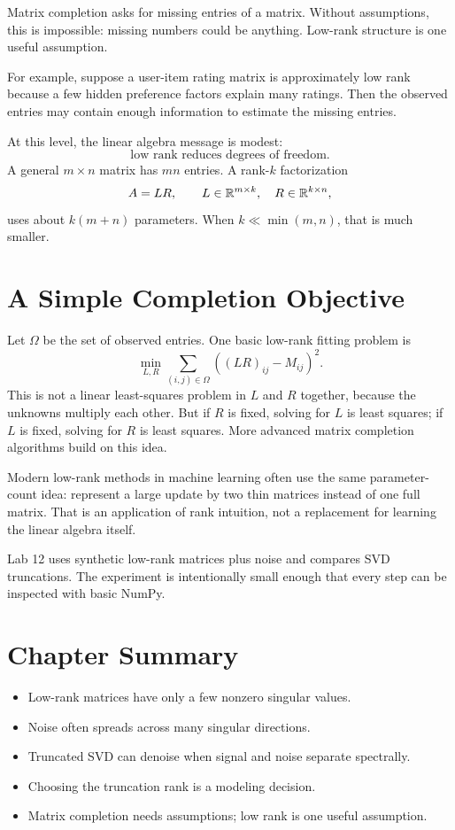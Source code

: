 Matrix completion asks for missing entries of a matrix. Without assumptions,
this is impossible: missing numbers could be anything. Low-rank structure is
one useful assumption.

For example, suppose a user-item rating matrix is approximately low rank
because a few hidden preference factors explain many ratings. Then the observed
entries may contain enough information to estimate the missing entries.

At this level, the linear algebra message is modest:
\[
  \text{low rank reduces degrees of freedom.}
\]
A general $m\times n$ matrix has $mn$ entries. A rank-$k$ factorization
\[
  A=LR,
  \qquad
  L\in\mathbb{R}^{m\times k},
  \quad
  R\in\mathbb{R}^{k\times n},
\]
uses about $k(m+n)$ parameters. When $k\ll \min(m,n)$, that is much smaller.

\section{A Simple Completion Objective}

Let $\Omega$ be the set of observed entries. One basic low-rank fitting problem
is
\[
  \min_{L,R}
  \sum_{(i,j)\in\Omega}
  \left((LR)_{ij}-M_{ij}\right)^2.
\]
This is not a linear least-squares problem in $L$ and $R$ together, because the
unknowns multiply each other. But if $R$ is fixed, solving for $L$ is least
squares; if $L$ is fixed, solving for $R$ is least squares. More advanced
matrix completion algorithms build on this idea.

\begin{aimlbox}
Modern low-rank methods in machine learning often use the same parameter-count
idea: represent a large update by two thin matrices instead of one full matrix.
That is an application of rank intuition, not a replacement for learning the
linear algebra itself.
\end{aimlbox}

\begin{labbox}
Lab 12 uses synthetic low-rank matrices plus noise and compares SVD
truncations. The experiment is intentionally small enough that every step can
be inspected with basic NumPy.
\end{labbox}

\section*{Chapter Summary}

\begin{itemize}
  \item Low-rank matrices have only a few nonzero singular values.
  \item Noise often spreads across many singular directions.
  \item Truncated SVD can denoise when signal and noise separate spectrally.
  \item Choosing the truncation rank is a modeling decision.
  \item Matrix completion needs assumptions; low rank is one useful assumption.
\end{itemize}


